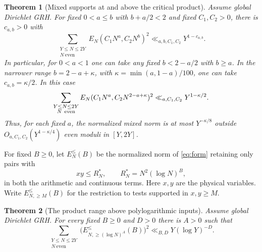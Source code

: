 \documentclass[11pt,a4paper]{article}
\numberwithin{equation}{section}
\newtheorem{theorem}{Theorem}[section]
\begin{document}
\begin{theorem}[Mixed supports at and above the critical product]
\label{thm:mixedpower}
Assume global Dirichlet GRH. For fixed $0<a\le b$ with
$b+a/2<2$ and fixed $C_1,C_2>0$, there is $c_{a,b}>0$ with
\begin{equation}
 \sum_{\substack{Y\le N\le2Y\\N\ \mathrm{even}}}
 E_N(C_1N^a,C_2N^b)^2 \ll_{a,b,C_1,C_2}Y^{1-c_{a,b}}.
 \label{eq:generalrectpowers}
\end{equation}
In particular, for $0<a<1$ one can take any fixed $b<2-a/2$
with $b\ge a$. In the narrower range $b=2-a+\kappa$, with
$\kappa=\min(a,1-a)/100$, one can take $c_{a,b}=\kappa/2$.
In this case
\begin{equation}
 \sum_{\substack{Y\le N\le2Y\\N\ {\rm even}}}
    E_N(C_1N^a,C_2N^{2-a+\kappa})^2
       \ll_{a,C_1,C_2}Y^{1-\kappa/2}.
 \label{eq:mixedpower}
\end{equation}
Thus, for each fixed $a$, the normalized mixed norm is at most
$Y^{-\kappa/8}$ outside $O_{a,C_1,C_2}(Y^{1-\kappa/4})$
even moduli in $[Y,2Y]$.
\end{theorem}

For fixed $B\ge0$, let $E_N^{\le}(B)$ be the normalized
norm of \cref{eq:form} retaining only pairs with
\begin{equation}
  xy\le R_N^*,\qquad R_N^*=N^2(\log N)^B ,
 \label{eq:productmask}
\end{equation}
in both the arithmetic and continuous terms. Here
$x,y$ are the physical variables. Write $E_{N,\ge M}^{\le}(B)$
for the restriction to tests supported in $x,y\ge M$.

\begin{theorem}[The product range above polylogarithmic inputs]
\label{thm:productwindow}
Assume global Dirichlet GRH. For every fixed $B\ge0$ and $D>0$
there is $A>0$ such that
\begin{equation}
 \sum_{\substack{Y\le N\le 2Y\\N\ \mathrm{even}}}
 \bigl(E_{N,\ge(\log N)^A}^{\le}(B)\bigr)^2
       \ll_{B,D}Y(\log Y)^{-D}.
 \label{eq:productwindow}
\end{equation}
\end{theorem}
\end{document}
